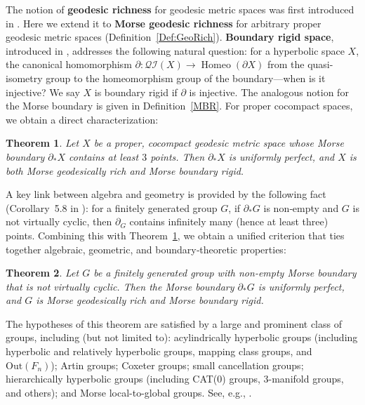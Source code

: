 \documentclass[a4paper,11pt,oneside]{article}
\newtheorem{Theorem}{Theorem}[section]
\begin{document}
The notion of \textbf{geodesic richness} for geodesic metric spaces was first introduced in \cite{Shchur13}.  
Here we extend it to \textbf{Morse geodesic richness} for arbitrary proper geodesic metric spaces (Definition~\ref{Def:GeoRich}).
\textbf{Boundary rigid space}, introduced in \cite{LiangZhou24}, addresses the following natural question: for a hyperbolic space $X$, the canonical homomorphism $\partial\colon\mathcal{QI}(X)\to\operatorname{Homeo}(\partial X)$ from the quasi-isometry group to the homeomorphism group of the boundary—when is it injective? We say $X$ is boundary rigid if $\partial$ is injective. The analogous notion for the Morse boundary is given in Definition~\ref{MBR}. For proper cocompact spaces, we obtain a direct characterization:

\begin{Theorem}\label{thm:cocompact}
Let $X$ be a proper, cocompact geodesic metric space whose Morse boundary $\partial_*X$ contains at least $3$ points. Then $\partial_*X$ is uniformly perfect, and $X$ is both Morse geodesically rich and Morse boundary rigid.
\end{Theorem}

A key link between algebra and geometry is provided by the following fact (Corollary~5.8 in \cite{Liu21}): for a finitely generated group $G$, if $\partial_*G$ is non‑empty and $G$ is not virtually cyclic, then $\partial_G$ contains infinitely many (hence at least three) points.
Combining this with Theorem~\ref{thm:cocompact}, we obtain a unified criterion that ties together algebraic, geometric, and boundary‑theoretic properties:
\begin{Theorem}\label{groupapp}
      Let $G$ be a finitely generated group with non-empty Morse boundary that is not virtually cyclic. Then the Morse boundary $\partial_* G$ is uniformly perfect, and $G$ is Morse geodesically rich and Morse boundary rigid. 
\end{Theorem}

The hypotheses of this theorem are satisfied by a large and prominent class of groups, including (but not limited to): acylindrically hyperbolic groups (including hyperbolic and relatively hyperbolic groups, mapping class groups, and $\text{Out}(F_n)$); Artin groups; Coxeter groups; small cancellation groups; hierarchically hyperbolic groups (including CAT(0) groups, 3-manifold groups, and others); and Morse local-to-global groups.
 See, e.g.,
\cite{CRSZ22, CordesHume17, CharneyCordesSisto23, cordes2025connectivity, GraeberKarrerLazarovich21, han2024growth, MousleyRussell19, Osin16, RussellSprianoTran22, Sisto16, Susse2023, Tran2019, Zbinden23, zbinden23Small, Zbinden24}.
\end{document}
